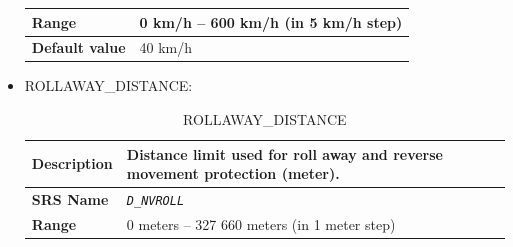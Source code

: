 \documentclass{template/openetcs}
\begin{document}
\begin{itemize}
\begin{longtable}{|l|l|}
				\hline
														
					\begin{minipage}[t]{0.22\linewidth} \textbf{Range}	\end{minipage} 
				&	\begin{minipage}[t]{0.78\linewidth} 0 km/h – 600 km/h (in 5 km/h step) \end{minipage} \\
				
				\hline
										
					\begin{minipage}[t]{0.22\linewidth} \textbf{Default value}	\end{minipage} 
				&	\begin{minipage}[t]{0.78\linewidth} 40 km/h \end{minipage} \\
				
				\hline
				
			\end{longtable}						
			
		\item ROLLAWAY\_DISTANCE:
		
			\begin{longtable}{|l|l|}
				\caption{ROLLAWAY\_DISTANCE}\\ 														
				\hline
				
					\begin{minipage}[t]{0.22\linewidth} \textbf{Description}	\end{minipage} 
				&	\begin{minipage}[t]{0.78\linewidth} Distance limit used for roll away and reverse movement protection (meter). \end{minipage} \\
				
				\hline
				
					\begin{minipage}[t]{0.22\linewidth} \textbf{SRS Name}	\end{minipage} 
				&	\begin{minipage}[t]{0.78\linewidth} \emph{\texttt{D\_NVROLL}} \end{minipage} \\
				
				\hline
														
					\begin{minipage}[t]{0.22\linewidth} \textbf{Range}	\end{minipage} 
				&	\begin{minipage}[t]{0.78\linewidth} 0 meters – 327 660 meters (in 1 meter step) \end{minipage} \\
				

\end{longtable}
\end{itemize}
\end{document}
